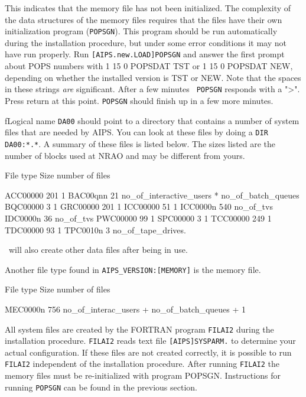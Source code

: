 \medskip{}

This indicates that the memory file has not been initialized. The
complexity of the data structures of the memory files requires that
the files have their own initialization program ({\tt POPSGN}).  This
program should be run automatically during the installation procedure,
but under some error conditions it may not have run properly.  Run
{\tt [AIPS.new.LOAD]POPSGN} and answer the first prompt about POPS
numbers with 1 15 0 POPSDAT TST or 1 15 0 POPSDAT NEW, depending on
whether the installed version is TST or NEW.  Note that the spaces in
these strings {\it are\/} significant.  After a few minutes {\tt
POPSGN} responds with a ">".  Press return at this point.  {\tt POPSGN}
should finish up in a few more minutes.
 
\medskip{}

fLogical name {\tt DA00} should point to a directory that contains a number of
system files that are needed by AIPS.  You can look at these files by
doing a {\tt DIR DA00:*.*}.  A summary of these files is listed below.  The
sizes listed are the number of blocks used at NRAO and may be different
from yours.\medskip

\fortran
File type   Size   number of files

ACC00000    201    1
BAC00qnn     21    no_of_interactive_users * no_of_batch_queues
BQC00000      3    1
GRC00000    201    1
ICC00000     51    1
ICC0000n    540    no_of_tvs
IDC0000n     36    no_of_tvs
PWC00000     99    1
SPC00000      3    1
TCC00000    249    1
TDC00000     93    1
TPC0010n      3    no_of_tape_drives.
\endfortran\medskip

\noindent
\aips\ will also create other data files after being in use.

\noindent
Another file type found in {\tt AIPS\_VERSION:[MEMORY]} is the memory file.
\medskip

\fortran 
File type   Size   number of files

MEC0000n    756    no_of_interac_users + no_of_batch_queues  +  1
\endfortran\medskip

All system files are created by the FORTRAN program {\tt FILAI2} during the
installation procedure.  {\tt FILAI2} reads text file {\tt [AIPS]SYSPARM.} to
determine your actual configuration.  If these files are not created
correctly, it is possible to run {\tt FILAI2} independent of the installation
procedure.  After running {\tt FILAI2} the memory files must be
re-initialized with program POPSGN.  Instructions for running {\tt POPSGN}
can be found in the previous section.

